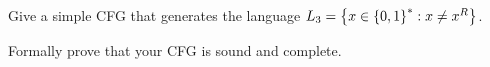 \begin{problem}
  Give a simple CFG that generates the language
  $L_3 = \left\{x \in \left\{0, 1\right\}^* : x \ne x^R\right\}$.

  \step
  Formally prove that your CFG is sound and complete.
\end{problem}
\begin{Answer}

\end{Answer}
